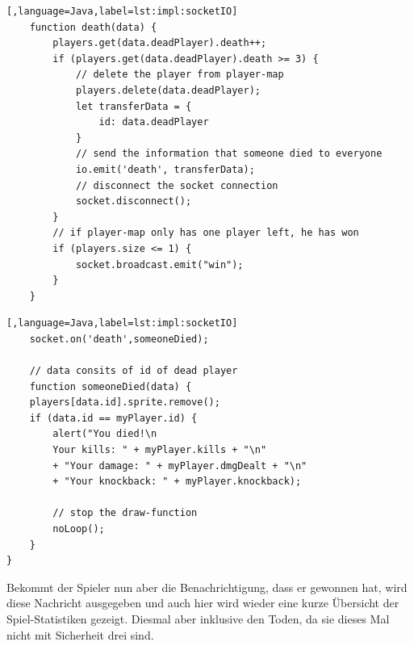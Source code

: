 \begin{lstlisting}[,language=Java,label=lst:impl:socketIO]
    function death(data) {
        players.get(data.deadPlayer).death++;
        if (players.get(data.deadPlayer).death >= 3) {
            // delete the player from player-map
            players.delete(data.deadPlayer);
            let transferData = {
                id: data.deadPlayer
            }
            // send the information that someone died to everyone
            io.emit('death', transferData);
            // disconnect the socket connection
            socket.disconnect();
        }
        // if player-map only has one player left, he has won 
        if (players.size <= 1) {
            socket.broadcast.emit("win");
        }
    }
 \end{lstlisting}


\begin{lstlisting}[,language=Java,label=lst:impl:socketIO]
    socket.on('death',someoneDied);

    // data consits of id of dead player
    function someoneDied(data) {
    players[data.id].sprite.remove();
    if (data.id == myPlayer.id) {
        alert("You died!\n
        Your kills: " + myPlayer.kills + "\n" 
        + "Your damage: " + myPlayer.dmgDealt + "\n" 
        + "Your knockback: " + myPlayer.knockback);

        // stop the draw-function
        noLoop();
    }
}
 \end{lstlisting}

Bekommt der Spieler nun aber die Benachrichtigung, dass er gewonnen hat, wird diese Nachricht ausgegeben und auch hier wird wieder eine kurze Übersicht der Spiel-Statistiken gezeigt.
Diesmal aber inklusive den Toden, da sie dieses Mal nicht mit Sicherheit drei sind.

